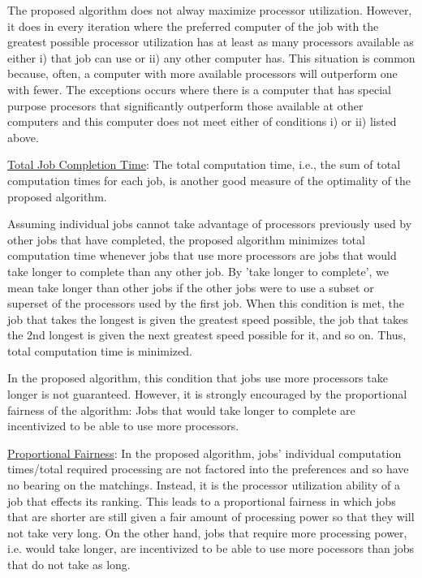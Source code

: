 \documentclass[conference]{IEEEtran}
\begin{document}
The proposed algorithm does not alway maximize processor 
utilization. However, it does in every iteration 
where the preferred computer of the job with
the greatest possible processor utilization
has at least as many processors 
available as either
    i) that job can use or
    ii) any other computer has.
This situation is common because, often, a computer with more 
available processors will outperform
one with fewer. The exceptions occurs where there is 
a computer that has special purpose procesors
that significantly outperform those available at other 
computers and this computer does not meet either 
of conditions i) or ii) listed above.

\underline{Total Job Completion Time}:
The total computation time, i.e., the 
sum of total computation times for each job,
is another good measure of the optimality 
of the proposed algorithm.

Assuming individual jobs cannot take advantage
of processors previously used by other jobs
that have completed, 
the proposed algorithm minimizes total 
computation time whenever 
jobs that use more processors are jobs that would take 
longer to complete than any other job. 
By 'take longer to complete', we mean take longer than
other jobs if the other jobs were to use a subset or 
superset of the processors used by the first job.
When this condition is met, the job that takes the
longest is given the greatest speed possible, the job that 
takes the 2nd longest is given the next greatest speed 
possible for it, and so on. 
Thus, total computation time is minimized.

In the proposed algorithm, this condition that jobs use
more processors take longer is not guaranteed.
However, it is strongly encouraged by the 
proportional fairness of the algorithm:
Jobs that would take longer to complete are incentivized
to be able to use more processors.

\underline{Proportional Fairness}:
In the proposed algorithm, jobs' individual computation
times/total required processing are not factored into
the preferences and so have no bearing on the matchings.
Instead, it is the processor utilization ability of 
a job that effects its ranking. This leads to a proportional
fairness in which jobs that are shorter are still given 
a fair amount of processing power so that they will not take
very long. 
On the other hand, jobs that
require more processing power, i.e. would take longer,
are incentivized to be able to use more pocessors than 
jobs that do not take as long.
\end{document}
